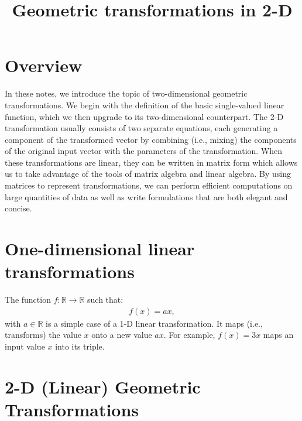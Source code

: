 \documentclass[12pt,letter]{article}
\title{{\bf Geometric transformations in 2-D} }
\date{}
\newcommand{\R}{\mathbb{R}}
\begin{document}
\maketitle
\vspace{-1.0in}



\section{Overview}
In these notes, we introduce the topic of two-dimensional geometric
transformations. We begin with the definition of the basic single-valued
linear function, which we then upgrade to its two-dimensional
counterpart. The 2-D transformation usually consists of two separate
equations, each generating a component of the transformed vector by
combining (i.e., mixing) the components of the original input vector
with the parameters of the transformation. When these transformations
are linear, they can be written in matrix form which allows us to take
advantage of the tools of matrix algebra and linear algebra. By using
matrices to represent transformations, we can perform efficient
computations on large quantities of data as well as write formulations
that are both elegant and concise.

\section{One-dimensional linear transformations}

The function $f: \mathbb{R} \rightarrow \mathbb{R}$ such that:
\begin{align}
	f(x) = ax,
		\label{linear1D}
\end{align}
with $a \in \R$ is a simple case of a 1-D linear transformation. It
maps (i.e., transforms) the value $x$ onto a new value $ax$. For example, $f\left(x\right) = 3x$ maps an input value $x$ into its triple.

\section{2-D (Linear) Geometric
Transformations}
\end{document}

